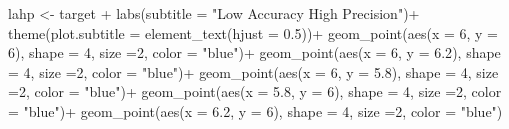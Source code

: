 \documentclass[
  letterpaper,
]{book}
\newenvironment{Shaded}{\begin{snugshade}}{\end{snugshade}}
\newcommand{\AttributeTok}[1]{\textcolor[rgb]{0.40,0.45,0.13}{#1}}
\newcommand{\DecValTok}[1]{\textcolor[rgb]{0.68,0.00,0.00}{#1}}
\newcommand{\FloatTok}[1]{\textcolor[rgb]{0.68,0.00,0.00}{#1}}
\newcommand{\FunctionTok}[1]{\textcolor[rgb]{0.28,0.35,0.67}{#1}}
\newcommand{\NormalTok}[1]{\textcolor[rgb]{0.00,0.23,0.31}{#1}}
\newcommand{\OtherTok}[1]{\textcolor[rgb]{0.00,0.23,0.31}{#1}}
\newcommand{\SpecialCharTok}[1]{\textcolor[rgb]{0.37,0.37,0.37}{#1}}
\newcommand{\StringTok}[1]{\textcolor[rgb]{0.13,0.47,0.30}{#1}}
\begin{document}
\begin{Shaded}
\begin{Highlighting}[]
\NormalTok{lahp }\OtherTok{\textless{}{-}}\NormalTok{ target }\SpecialCharTok{+}
  \FunctionTok{labs}\NormalTok{(}\AttributeTok{subtitle =} \StringTok{"Low Accuracy High Precision"}\NormalTok{)}\SpecialCharTok{+}
  \FunctionTok{theme}\NormalTok{(}\AttributeTok{plot.subtitle =} \FunctionTok{element\_text}\NormalTok{(}\AttributeTok{hjust =} \FloatTok{0.5}\NormalTok{))}\SpecialCharTok{+}
  \FunctionTok{geom\_point}\NormalTok{(}\FunctionTok{aes}\NormalTok{(}\AttributeTok{x =} \DecValTok{6}\NormalTok{, }\AttributeTok{y =} \DecValTok{6}\NormalTok{), }\AttributeTok{shape =} \DecValTok{4}\NormalTok{, }\AttributeTok{size =}\DecValTok{2}\NormalTok{, }\AttributeTok{color =} \StringTok{"blue"}\NormalTok{)}\SpecialCharTok{+}
  \FunctionTok{geom\_point}\NormalTok{(}\FunctionTok{aes}\NormalTok{(}\AttributeTok{x =} \DecValTok{6}\NormalTok{, }\AttributeTok{y =} \FloatTok{6.2}\NormalTok{), }\AttributeTok{shape =} \DecValTok{4}\NormalTok{, }\AttributeTok{size =}\DecValTok{2}\NormalTok{, }\AttributeTok{color =} \StringTok{"blue"}\NormalTok{)}\SpecialCharTok{+}
  \FunctionTok{geom\_point}\NormalTok{(}\FunctionTok{aes}\NormalTok{(}\AttributeTok{x =} \DecValTok{6}\NormalTok{, }\AttributeTok{y =} \FloatTok{5.8}\NormalTok{), }\AttributeTok{shape =} \DecValTok{4}\NormalTok{, }\AttributeTok{size =}\DecValTok{2}\NormalTok{, }\AttributeTok{color =} \StringTok{"blue"}\NormalTok{)}\SpecialCharTok{+}
  \FunctionTok{geom\_point}\NormalTok{(}\FunctionTok{aes}\NormalTok{(}\AttributeTok{x =} \FloatTok{5.8}\NormalTok{, }\AttributeTok{y =} \DecValTok{6}\NormalTok{), }\AttributeTok{shape =} \DecValTok{4}\NormalTok{, }\AttributeTok{size =}\DecValTok{2}\NormalTok{, }\AttributeTok{color =} \StringTok{"blue"}\NormalTok{)}\SpecialCharTok{+}
  \FunctionTok{geom\_point}\NormalTok{(}\FunctionTok{aes}\NormalTok{(}\AttributeTok{x =} \FloatTok{6.2}\NormalTok{, }\AttributeTok{y =} \DecValTok{6}\NormalTok{), }\AttributeTok{shape =} \DecValTok{4}\NormalTok{, }\AttributeTok{size =}\DecValTok{2}\NormalTok{, }\AttributeTok{color =} \StringTok{"blue"}\NormalTok{)}



\end{Highlighting}
\end{Shaded}
\end{document}
